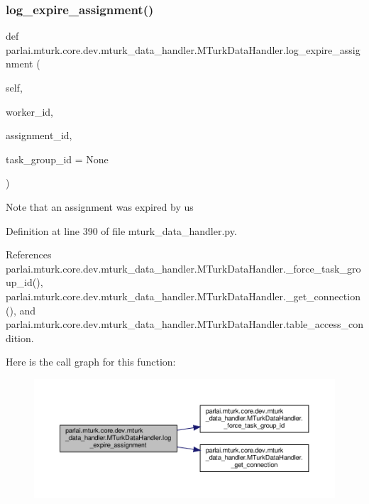 \subsubsection{\texorpdfstring{log\+\_\+expire\+\_\+assignment()}{log\_expire\_assignment()}}
{\footnotesize\ttfamily def parlai.\+mturk.\+core.\+dev.\+mturk\+\_\+data\+\_\+handler.\+M\+Turk\+Data\+Handler.\+log\+\_\+expire\+\_\+assignment (\begin{DoxyParamCaption}\item[{}]{self,  }\item[{}]{worker\+\_\+id,  }\item[{}]{assignment\+\_\+id,  }\item[{}]{task\+\_\+group\+\_\+id = {\ttfamily None} }\end{DoxyParamCaption})}

\begin{DoxyVerb}Note that an assignment was expired by us\end{DoxyVerb}
 

Definition at line 390 of file mturk\+\_\+data\+\_\+handler.\+py.



References parlai.\+mturk.\+core.\+dev.\+mturk\+\_\+data\+\_\+handler.\+M\+Turk\+Data\+Handler.\+\_\+force\+\_\+task\+\_\+group\+\_\+id(), parlai.\+mturk.\+core.\+dev.\+mturk\+\_\+data\+\_\+handler.\+M\+Turk\+Data\+Handler.\+\_\+get\+\_\+connection(), and parlai.\+mturk.\+core.\+dev.\+mturk\+\_\+data\+\_\+handler.\+M\+Turk\+Data\+Handler.\+table\+\_\+access\+\_\+condition.

Here is the call graph for this function\+:
\nopagebreak
\begin{figure}[H]
\begin{center}
\leavevmode
\includegraphics[width=350pt]{classparlai_1_1mturk_1_1core_1_1dev_1_1mturk__data__handler_1_1MTurkDataHandler_ab175fd5970bfd7b24751ad99e7b99111_cgraph}
\end{center}
\end{figure}
\mbox{\label{classparlai_1_1mturk_1_1core_1_1dev_1_1mturk__data__handler_1_1MTurkDataHandler_a520efb5a04ffab6b689c0562997f76e0}} 
